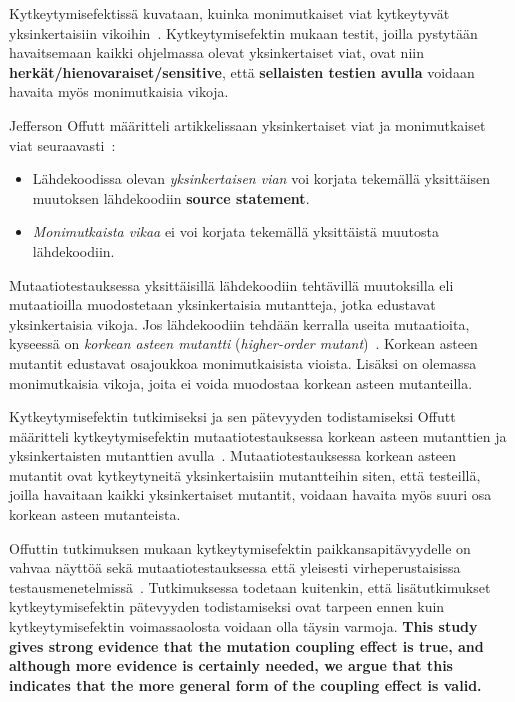 \documentclass[finnish, grading]{tktltiki2}
\theoremstyle{definition}
\theoremstyle{remark}
\begin{document}
Kytkeytymisefektissä kuvataan, kuinka monimutkaiset viat kytkeytyvät yksinkertaisiin vikoihin~\cite[s. 35]{DeMillo:Lipton:Sayward:1978}. Kytkeytymisefektin mukaan testit, joilla pystytään havaitsemaan kaikki ohjelmassa olevat yksinkertaiset viat, ovat niin \textbf{herkät/hienovaraiset/sensitive}, että \textbf{sellaisten testien avulla} voidaan havaita myös monimutkaisia vikoja. 

Jefferson Offutt määritteli artikkelissaan yksinkertaiset viat ja monimutkaiset viat seuraavasti~\cite[s. 6]{Offutt:1992:Coupling}:
\begin{itemize}
  \item Lähdekoodissa olevan \textit{yksinkertaisen vian} voi korjata tekemällä yksittäisen muutoksen lähdekoodiin \textbf{source statement}.
  \item \textit{Monimutkaista vikaa} ei voi korjata tekemällä yksittäistä muutosta lähdekoodiin.
\end{itemize}
Mutaatiotestauksessa yksittäisillä lähdekoodiin tehtävillä muutoksilla eli mutaatioilla muodostetaan yksinkertaisia mutantteja, jotka edustavat yksinkertaisia vikoja. Jos lähdekoodiin tehdään kerralla useita mutaatioita, kyseessä on \textit{korkean asteen mutantti} (\textit{higher-order mutant})~\cite[s. 6]{Offutt:1992:Coupling}. Korkean asteen mutantit edustavat osajoukkoa monimutkaisista vioista. Lisäksi on olemassa monimutkaisia vikoja, joita ei voida muodostaa korkean asteen mutanteilla.

Kytkeytymisefektin tutkimiseksi ja sen pätevyyden todistamiseksi Offutt määritteli kytkeytymisefektin mutaatiotestauksessa korkean asteen mutanttien ja yksinkertaisten mutanttien avulla~\cite[s. 6]{Offutt:1992:Coupling}. Mutaatiotestauksessa korkean asteen mutantit ovat kytkeytyneitä yksinkertaisiin mutantteihin siten, että testeillä, joilla havaitaan kaikki yksinkertaiset mutantit, voidaan havaita myös suuri osa korkean asteen mutanteista. 

Offuttin tutkimuksen mukaan kytkeytymisefektin paikkansapitävyydelle on vahvaa näyttöä sekä mutaatiotestauksessa että yleisesti virheperustaisissa testausmenetelmissä~\cite[s. 6]{Offutt:1992:Coupling}. Tutkimuksessa todetaan kuitenkin, että lisätutkimukset kytkeytymisefektin pätevyyden todistamiseksi ovat tarpeen ennen kuin kytkeytymisefektin voimassaolosta voidaan olla täysin varmoja. \textbf{This study gives strong evidence that the mutation coupling effect is true, and although more evidence is certainly needed, we argue that this indicates that the more general form of the coupling effect is valid.}
\end{document}
